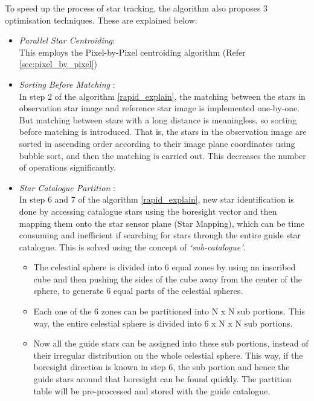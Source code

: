 \documentclass[../../main.tex]{subfiles}
\begin{document}
To speed up the process of star tracking, the algorithm also proposes 3 optimisation techniques. These are explained below:
\begin{itemize}
    \item \textit{Parallel Star Centroiding}:\\
    This employs the Pixel-by-Pixel centroiding algorithm (Refer \ref{sec:pixel_by_pixel})
    
    \item \textit{Sorting Before Matching} \label{sorting_before_matching}:\\
    In step 2 of the algorithm \ref{rapid_explain}, the matching between the stars in observation star image and reference star image is implemented one-by-one. But matching between stars with a long distance is meaningless, so sorting before matching is introduced. That is, the stars in the observation image are sorted in ascending order according to their image plane coordinates using bubble sort, and then the matching is carried out. This decreases the number of operations significantly. 
    
    \item \textit{Star Catalogue Partition} \label{catalogue_partition}:\\
    In step 6 and 7 of the algorithm \ref{rapid_explain}, new star identification is done by accessing catalogue stars using the boresight vector and then mapping them onto the star sensor plane (Star Mapping), which can be time consuming and inefficient if searching for stars through the entire guide star catalogue. This is solved using the concept of \textit{`sub-catalogue'}.
    \begin{itemize}
        \item The celestial sphere is divided into 6 equal zones by using an inscribed cube and then pushing the sides of the cube away from the center of the sphere, to generate 6 equal parts of the celestial spheres. 
        \item Each one of the 6 zones can be partitioned into N x N sub portions. This way, the entire celestial sphere is divided into 6 x N x N sub portions. 
        \item Now all the guide stars can be assigned into these sub portions, instead of their irregular distribution on the whole celestial sphere. This way, if the boresight direction is known in step 6, the sub portion and hence the guide stars around that boresight can be found quickly. The partition table will be pre-processed and stored with the guide catalogue. 
    \end{itemize}
\end{itemize}
\end{document}
